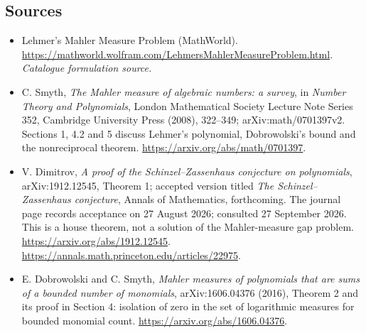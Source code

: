 \documentclass[11pt,a4paper]{article}
\begin{document}
\subsection{Sources}
\begin{itemize}\raggedright
\item[\textnormal{[S1]}]\hypertarget{source:206:1}{} Lehmer's Mahler Measure Problem (MathWorld).
\url{https://mathworld.wolfram.com/LehmersMahlerMeasureProblem.html}.
{\small\textit{Catalogue formulation source.}}
\item[\textnormal{[E1]}]\hypertarget{extra:206:1}{}
C. Smyth, \emph{The Mahler measure of algebraic numbers: a survey},
in \emph{Number Theory and Polynomials}, London Mathematical Society
Lecture Note Series 352, Cambridge University Press (2008), 322--349;
arXiv:math/0701397v2. Sections 1, 4.2 and 5 discuss Lehmer's polynomial,
Dobrowolski's bound and the nonreciprocal theorem.
\url{https://arxiv.org/abs/math/0701397}.
\item[\textnormal{[E2]}]\hypertarget{extra:206:2}{}
V. Dimitrov, \emph{A proof of the Schinzel--Zassenhaus conjecture on
polynomials}, arXiv:1912.12545, Theorem 1; accepted version titled
\emph{The Schinzel--Zassenhaus conjecture}, Annals of Mathematics,
forthcoming. The journal page records acceptance on 27 August 2026;
consulted 27 September 2026. This is a house theorem, not a solution
of the Mahler-measure gap problem.
\url{https://arxiv.org/abs/1912.12545}.
\url{https://annals.math.princeton.edu/articles/22975}.
\item[\textnormal{[E3]}]\hypertarget{extra:206:3}{}
E. Dobrowolski and C. Smyth, \emph{Mahler measures of polynomials that
are sums of a bounded number of monomials}, arXiv:1606.04376 (2016),
Theorem 2 and its proof in Section 4: isolation of zero in the set
of logarithmic measures for bounded monomial count.
\url{https://arxiv.org/abs/1606.04376}.
\end{itemize}
\end{document}

